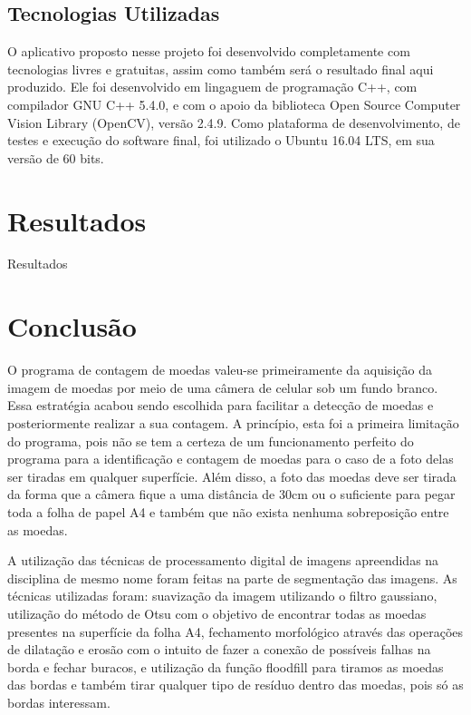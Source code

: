 \documentclass[10pt,journal,compsoc]{IEEEtran}
\begin{document}
\subsection{Tecnologias Utilizadas}
\label{sec:metodologia:tecnologias-envolvidas}

O aplicativo proposto nesse projeto foi desenvolvido completamente com tecnologias livres e gratuitas, assim como também será o resultado final aqui produzido. Ele foi desenvolvido em lingaguem de programação C++, com compilador GNU C++ 5.4.0, e com o apoio da biblioteca Open Source Computer Vision Library (OpenCV), versão 2.4.9. Como plataforma de desenvolvimento, de testes e execução do software final, foi utilizado o Ubuntu 16.04 LTS, em sua versão de 60 bits.



\section{Resultados}
\label{sec:resultados}

Resultados

\section{Conclusão}
\label{sec:conclusao}

O programa de contagem de moedas valeu-se primeiramente da aquisição da imagem de moedas por meio de uma câmera de celular sob um fundo branco. Essa estratégia acabou sendo escolhida para facilitar a detecção de moedas e posteriormente realizar a sua contagem. A princípio, esta foi a primeira limitação do programa, pois não se tem a certeza de um funcionamento perfeito do programa para a identificação e contagem de moedas para o caso de a foto delas ser tiradas em qualquer superfície. Além disso, a foto das moedas deve ser tirada da forma que a câmera fique a uma distância de 30cm ou o suficiente para pegar toda a folha de papel A4 e também que não exista nenhuma sobreposição entre as moedas.

A utilização das técnicas de processamento digital de imagens apreendidas na disciplina de mesmo nome foram feitas na parte de segmentação das imagens. As técnicas utilizadas foram: suavização da imagem utilizando o filtro gaussiano, utilização do método de Otsu com o objetivo de encontrar todas as moedas presentes na superfície da folha A4, fechamento morfológico através das operações de dilatação e erosão com o intuito de fazer a conexão de possíveis falhas na borda e fechar buracos, e utilização da função floodfill para tiramos as moedas das bordas e também tirar qualquer tipo de resíduo dentro das moedas, pois só as bordas interessam.
\end{document}

